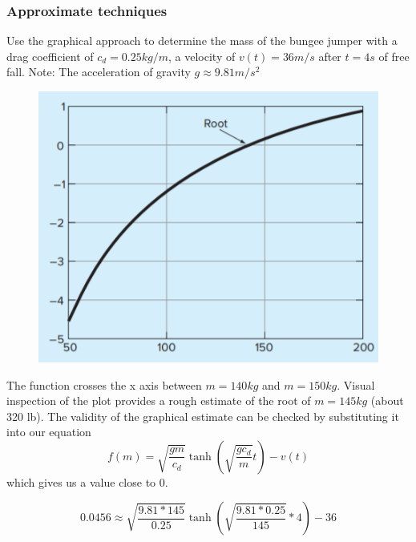 \documentclass{if-beamer}
\begin{document}
\begin{frame}
\frametitle{Approximate techniques}
Use the graphical approach to determine the mass of the bungee jumper with a drag coefficient of $c_d = 0.25 kg/m$, a velocity of $v(t)=36 m/s$ after $t = 4 s$ of free fall. Note: The acceleration of gravity $g \approx 9.81 m/s^2$ \\
\vspace{5pt}
\begin{minipage}{0.5\textwidth}
	\begin{figure}
		\centering
		\includegraphics[width = \textwidth]{figures/BunjeeJumpGraph}
	\end{figure}
\end{minipage}
\begin{minipage}{0.5\textwidth}
	The function crosses the x axis between $m= 140 kg$ and $m=150 kg$. Visual inspection of the plot provides a rough estimate of the root of $m=145 kg$ (about 320 lb). The validity of the graphical estimate can be checked by substituting it into our equation
	$$f(m) = \sqrt{\frac{gm}{c_d}}\tanh\left(\sqrt{\frac{gc_d}{m}}t\right) -v(t) $$
	which gives us a value close to 0.
\end{minipage}
$$0.0456\approx \sqrt{\frac{9.81*145}{0.25}}\tanh\left(\sqrt{\frac{9.81*0.25}{145}}*4\right) -36 $$
\end{frame}
\end{document}
